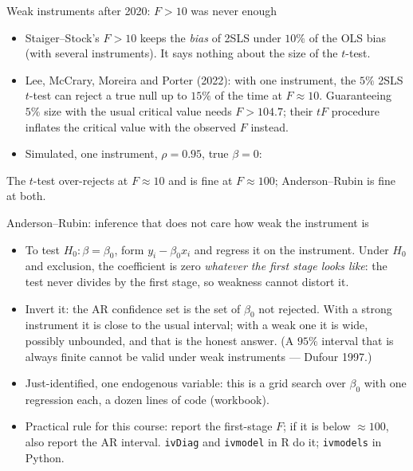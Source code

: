\documentclass[aspectratio=169,11pt]{beamer}
\begin{document}
\begin{frame}{Weak instruments after 2020: $F > 10$ was never enough}
\begin{itemize}
	\item Staiger--Stock's $F > 10$ keeps the \emph{bias} of 2SLS under $10\%$ of the OLS bias (with several instruments). It says
	nothing about the size of the $t$-test.
	\item Lee, McCrary, Moreira and Porter (2022): with one instrument, the $5\%$ 2SLS $t$-test can reject a
	true null up to $15\%$ of the time at $F \approx 10$. Guaranteeing $5\%$ size with the usual critical
	value needs $F > 104.7$; their \alert{$tF$ procedure} inflates the critical value with the observed $F$ instead.
	\item Simulated, one instrument, $\rho = 0.95$, true $\beta = 0$:
\end{itemize}
\begin{center}
\small

\end{center}
The $t$-test over-rejects at $F \approx 10$ and is fine at $F \approx 100$; Anderson--Rubin is fine at both.
\end{frame}


\begin{frame}{Anderson--Rubin: inference that does not care how weak the instrument is}
\begin{itemize}
	\item To test $H_0: \beta = \beta_0$, form $y_i - \beta_0 x_i$ and regress it on the instrument. Under $H_0$
	and exclusion, the coefficient is zero \emph{whatever the first stage looks like}: the test never divides by
	the first stage, so weakness cannot distort it.
	\medskip
	\item Invert it: the \alert{AR confidence set} is the set of $\beta_0$ not rejected. With a strong
	instrument it is close to the usual interval; with a weak one it is wide, possibly unbounded, and that
	is the honest answer. (A $95\%$ interval that is always finite cannot be valid under weak instruments
	--- Dufour 1997.)
	\medskip
	\item Just-identified, one endogenous variable: this is a grid search over $\beta_0$ with one regression
	each, a dozen lines of code (workbook).
	\medskip
	\item Practical rule for this course: report the first-stage $F$; if it is below $\approx 100$, also report
	the AR interval. \texttt{ivDiag} and \texttt{ivmodel} in R do it; \texttt{ivmodels} in Python.
\end{itemize}
\end{frame}
\end{document}
